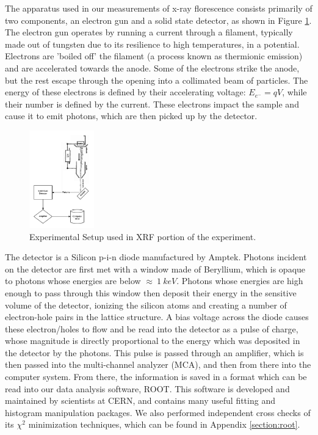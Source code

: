\documentclass[%
 reprint,
 amsmath,amssymb,
 aps,
 pra,
]{revtex4-1}
\begin{document}
The apparatus used in our measurements of x-ray florescence consists primarily of two components, an electron gun and a solid state detector, as shown in Figure \ref{fig:xrf_setup}. The electron gun operates by running a current through a filament, typically made out of tungsten due to its resilience to high temperatures, in a potential. Electrons are 'boiled off' the filament (a process known as thermionic emission) and are accelerated towards the anode. Some of the electrons strike the anode, but the rest escape through the opening into a collimated beam of particles. The energy of these electrons is defined by their accelerating voltage: $E_{e^-} = qV$, while their number is defined by the current.  These electrons impact the sample and cause it to emit photons, which are then picked up by the detector. 

\begin{figure}[H]
	\centering
	\includegraphics[width=0.25\textwidth]{xrf_experiment.png}
	\caption{Experimental Setup used in XRF portion of the experiment.}
	\label{fig:xrf_setup}
\end{figure}

The detector is a Silicon p-i-n diode manufactured by Amptek. Photons incident on the detector are first met with a window made of Beryllium, which is opaque to photons whose energies are below $\approx ~1~keV$. Photons whose energies are high enough to pass through this window then deposit their energy in the sensitive volume of the detector, ionizing the silicon atoms and creating a number of electron-hole pairs in the lattice structure. A bias voltage across the diode causes these electron/holes to flow and be read into the detector as a pulse of charge, whose magnitude is directly proportional to the energy which was deposited in the detector by the photons. This pulse is passed through an amplifier, which is then passed into the multi-channel analyzer (MCA), and then from there into the computer system. From there, the information is saved in a format which can be read into our data analysis software, ROOT. This software is developed and maintained by scientists at CERN, and contains many useful fitting and histogram manipulation packages. We also performed independent cross checks of its $\chi^2$ minimization techniques, which can be found in Appendix \ref{section:root}.
\end{document}
